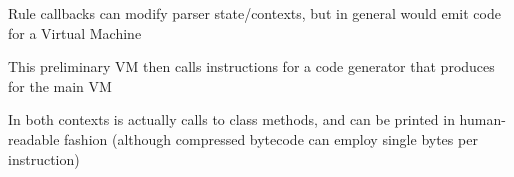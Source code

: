 \begin{frame}{}
\begin{center}
{\begin{minipage}{\textwidth}
\begin{minipage}{.88\textwidth}
{\begin{enumerate}
\dmitem {\dksp} Rule callbacks can modify parser state/contexts, but in general 
would emit code for a  Virtual Machine \vspace*{11pt}

\dmitem {\dksp} This preliminary VM then calls instructions for a code generator 
that produces  for the main VM \vspace*{11pt}

\dmitem {\dksp} In both contexts  is actually calls to class methods, 
and can be printed in human-readable fashion (although compressed bytecode can employ single bytes per instruction)


\end{enumerate}}
\end{minipage}

\end{minipage}

}

\end{center}


\end{frame}


